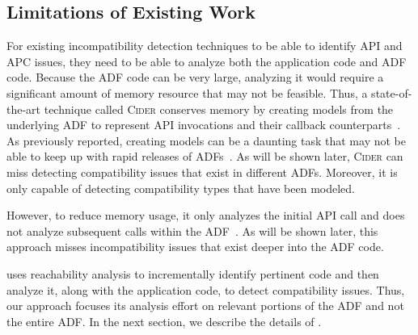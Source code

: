 \subsection{Limitations of Existing Work}


For existing incompatibility detection techniques to be able
to identify API and APC issues, they need to be able to
analyze both the application code and ADF code. Because the
ADF code can be very large, analyzing it would require a
significant amount of memory resource that may not be
feasible. Thus, a state-of-the-art technique called
\textsc{Cider}  conserves memory by creating models from the
underlying ADF to represent API invocations and their
callback counterparts~\cite{huang2018understanding}.  As
previously reported, creating models can be a daunting task
that may not be able to keep up with rapid releases of
ADFs~\cite{vanderMerwe2012}.  As will be shown later,
\textsc{Cider} can miss detecting compatibility issues that
exist in different ADFs.  Moreover, it is only capable of
detecting compatibility types that have been modeled.

 However, to reduce
memory usage, it only analyzes the initial API call and does
not analyze subsequent calls within the
ADF~\cite{lili2018cid}. 
As will be
shown later, this approach misses incompatibility issues
that exist deeper into the ADF code.  

\@approach uses reachability analysis to
incrementally identify pertinent code and then analyze it,
along with the application code, to detect compatibility
issues. Thus, our approach focuses its analysis effort on
relevant portions of the ADF and not the entire ADF.  
In the next section, we describe the details of
\@approach.

